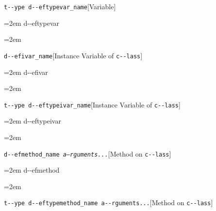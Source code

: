 \documentclass{book}
\begin{document}
\endgroup{}%
\noindent\texttt{t{-}{-}ype d{-}{-}eftypevar\_name}\hfill[Variable]



%
\par\begingroup\obeylines\obeyspaces\frenchspacing\leftskip=2em\relax\parskip=0pt\relax\ttfamily{}%
d{-}{-}eftypevar
\endgroup{}%
\par\begingroup\obeylines\obeyspaces\frenchspacing\leftskip=2em\relax\parskip=0pt\relax\ttfamily{}%

\endgroup{}%
\noindent\texttt{d{-}{-}efivar\_name}\hfill[Instance Variable of \texttt{c{-}{-}lass}]



%
\par\begingroup\obeylines\obeyspaces\frenchspacing\leftskip=2em\relax\parskip=0pt\relax\ttfamily{}%
d{-}{-}efivar
\endgroup{}%
\par\begingroup\obeylines\obeyspaces\frenchspacing\leftskip=2em\relax\parskip=0pt\relax\ttfamily{}%

\endgroup{}%
\noindent\texttt{t{-}{-}ype d{-}{-}eftypeivar\_name}\hfill[Instance Variable of \texttt{c{-}{-}lass}]



%
\par\begingroup\obeylines\obeyspaces\frenchspacing\leftskip=2em\relax\parskip=0pt\relax\ttfamily{}%
d{-}{-}eftypeivar
\endgroup{}%
\par\begingroup\obeylines\obeyspaces\frenchspacing\leftskip=2em\relax\parskip=0pt\relax\ttfamily{}%

\endgroup{}%
\noindent\texttt{d{-}{-}efmethod\_name \EmbracOn{}\textnormal{\textsl{a--rguments...}}\EmbracOff{}}\hfill[Method on \texttt{c{-}{-}lass}]



%
\par\begingroup\obeylines\obeyspaces\frenchspacing\leftskip=2em\relax\parskip=0pt\relax\ttfamily{}%
d{-}{-}efmethod
\endgroup{}%
\par\begingroup\obeylines\obeyspaces\frenchspacing\leftskip=2em\relax\parskip=0pt\relax\ttfamily{}%

\endgroup{}%
\noindent\texttt{t{-}{-}ype d{-}{-}eftypemethod\_name a{-}{-}rguments...}\hfill[Method on \texttt{c{-}{-}lass}]
\end{document}

